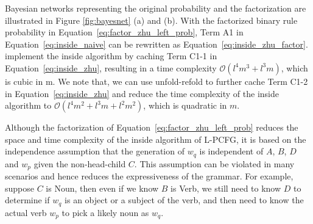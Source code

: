 \documentclass[11pt,a4paper]{article}
\begin{document}
Bayesian networks representing the original probability and the factorization are illustrated in Figure \ref{fig:bayesnet} (a) and (b).
With the factorized binary rule probability in Equation~\ref{eq:factor_zhu_left_prob},
Term A1 in Equation~\ref{eq:inside_naive} can be rewritten as Equation~\ref{eq:inside_zhu_factor}.
\citet{zhu-etal-2020-return} implement the inside algorithm by caching Term C1-1 in Equation~\ref{eq:inside_zhu}, resulting in a time complexity $\mathcal{O}(l^4m^3 + l^3m)$, which is cubic in m.
We note that, 
we can use unfold-refold to further cache Term C1-2 in Equation~\ref{eq:inside_zhu} and reduce the time complexity of the inside algorithm to $\mathcal{O}(l^4m^2 + l^3m + l^2m^2)$,
which is quadratic in $m$. 



Although the factorization of Equation~\ref{eq:factor_zhu_left_prob} reduces the space and time complexity of the inside algorithm of  L-PCFG, it is based on the independence assumption that the generation of $w_q$ is independent of $A$, $B$, $D$ and $w_p$ given the non-head-child $C$.
This assumption can be violated in many scenarios and hence reduces the expressiveness of the grammar.
For example, suppose $C$ is Noun, then even if we know $B$ is Verb, we still need to know $D$ to determine if $w_q$ is an object or a subject of the verb, and then need to know the actual verb $w_p$ to pick a likely noun as $w_q$. 
\end{document}
